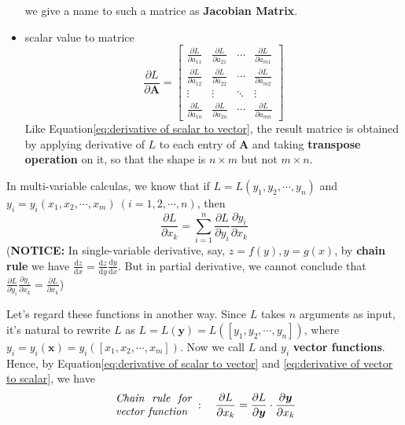 \documentclass{article}
\newcommand{\Derivative}[2]{\ensuremath{\frac{\partial#1}{\partial#2}}}
\begin{document}
\begin{itemize}
    we give a name to such a matrice as \textbf{Jacobian Matrix}.
    \item scalar value to matrice \begin{equation}\label{eq:derivative of scalar to matrice}
        \Derivative{L}{\boldsymbol{A}}=\begin{bmatrix}
            \Derivative{L}{a_{11}}&\Derivative{L}{a_{21}}&\cdots&\Derivative{L}{a_{m1}}\\
            \Derivative{L}{a_{12}}&\Derivative{L}{a_{22}}&\cdots&\Derivative{L}{a_{m2}}\\
            \vdots&\vdots&\ddots&\vdots\\
            \Derivative{L}{a_{1n}}&\Derivative{L}{a_{2n}}&\cdots&\Derivative{L}{a_{mn}}
        \end{bmatrix}
    \end{equation}
    Like {\sc Equation}\eqref{eq:derivative of scalar to vector}, the result matrice is obtained by applying derivative of $L$ to each entry of $\boldsymbol{A}$ and taking \textbf{transpose operation} on it, so that the shape is $n\times m$ but not $m\times n$.
\end{itemize}

In multi-variable calculas, we know that if $L=L(y_1,y_2,\cdots,y_n)$ and $y_i=y_i(x_1,x_2,\cdots,x_m)\:(i=1,2,\cdots,n)$, then$$\Derivative{L}{x_k}=\sum_{i=1}^n \Derivative{L}{y_i}\Derivative{y_i}{x_k}$$ 
(\textbf{NOTICE: } In single-variable derivative, say, $z=f(y),y=g(x)$, by \textbf{chain rule} we have $\frac{\mathrm{d}z}{\mathrm{d}x}=\frac{\mathrm{d}z}{\mathrm{d}y}\frac{\mathrm{d}y}{\mathrm{d}x}$. But in partial derivative, we cannot conclude that $\frac{\partial L}{\partial y_i}\frac{\partial y_i}{\partial x_k}=\frac{\partial L}{\partial x_k}$)

Let's regard these functions in another way. Since $L$ takes $n$ arguments as input, it's natural to rewrite $L$ as $L=L(\boldsymbol{y})=L([y_1,y_2,\cdots,y_n])$, where $y_i=y_i(\boldsymbol{x})=y_i([x_1,x_2,\cdots,x_m])$. Now we call $L$ and $y_i$ \textbf{vector functions}. 
Hence, by {\sc Equation}\eqref{eq:derivative of scalar to vector} and \eqref{eq:derivative of vector to scalar}, we have
\newlength{\LenForPrefixIllustrationOfEquation}
\settowidth{\LenForPrefixIllustrationOfEquation}{(Chain rule for}
\begin{equation}\label{eq:chain rule for vector funtion}
    \text{
        \parbox[c]{0.2\linewidth}{\it Chain rule for vector function}
    }:\quad\Derivative{L}{x_k}=\Derivative{L}{\boldsymbol{y}}\cdot\Derivative{\boldsymbol{y}}{x_k}
\end{equation}
\end{document}
